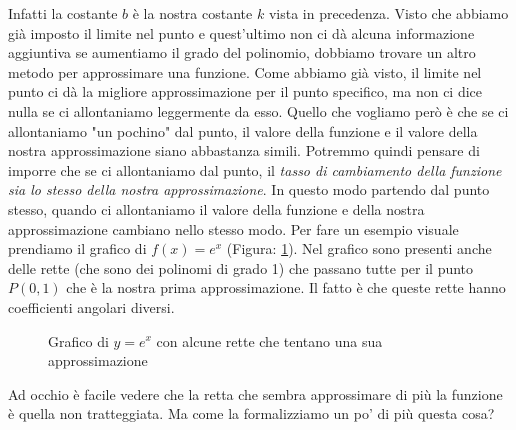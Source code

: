 Infatti la costante $b$ è la nostra costante $k$ vista in precedenza. Visto che abbiamo già imposto il limite nel punto e quest'ultimo non ci dà alcuna informazione aggiuntiva se aumentiamo il grado del polinomio, dobbiamo trovare un altro metodo per approssimare una funzione. Come abbiamo già visto, il limite nel punto ci dà la migliore approssimazione per il punto specifico, ma non ci dice nulla se ci allontaniamo leggermente da esso. Quello che vogliamo però è che se ci allontaniamo "un pochino" dal punto, il valore della funzione e il valore della nostra approssimazione siano abbastanza simili. Potremmo quindi pensare di imporre che se ci allontaniamo dal punto, il \textit{tasso di cambiamento della funzione sia lo stesso della nostra approssimazione}. In questo modo partendo dal punto stesso, quando ci allontaniamo il valore della funzione e della nostra approssimazione cambiano nello stesso modo. Per fare un esempio visuale prendiamo il grafico di $f(x) = e^x$ (Figura: \ref{fig_esponenzialeGrafico}). Nel grafico sono presenti anche delle rette (che sono dei polinomi di grado 1) che passano tutte per il punto $P(0, 1)$ che è la nostra prima approssimazione. Il fatto è che queste rette hanno coefficienti angolari diversi.

\begin{figure}[h]
\centering
{}
\caption{Grafico di $y = e^x$ con alcune rette che tentano una sua approssimazione}
	\label{fig_esponenzialeGrafico}
\end{figure}


Ad occhio è facile vedere che la retta che sembra approssimare di più la funzione è quella non tratteggiata. Ma come la formalizziamo un po' di più questa cosa?

